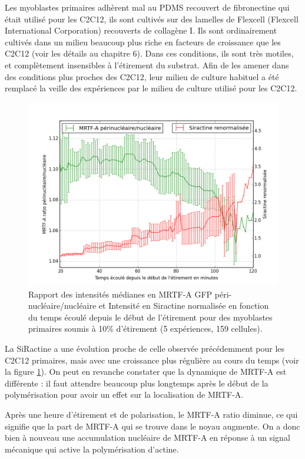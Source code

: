 Les myoblastes primaires adhèrent mal au PDMS recouvert de fibronectine qui était utilisé pour les C2C12, ils sont cultivés sur des lamelles de Flexcell (Flexcell International Corporation) recouverts de collagène I. 
Ils sont ordinairement cultivés dans un milieu beaucoup plus riche en facteurs de croissance que les C2C12 (voir les détails au chapitre 6). 
Dans ces conditions, ils sont très motiles, et complètement insensibles à l'étirement du substrat. 
Afin de les amener dans des conditions plus proches des C2C12, leur milieu de culture habituel a été remplacé la veille des expériences par le milieu de culture utilisé pour les C2C12. 

\begin{figure}
\includegraphics[scale=0.4]{Figures/Siractine_MRTFA_vs_temps.png} 
\caption{Rapport des intensités médianes en MRTF-A GFP  péri-nucléaire/nucléaire et Intensité en Siractine normalisée en fonction du temps écoulé depuis le début de l'étirement pour des myoblastes primaires soumis à 10\% d'étirement (5 expériences, 159 cellules). \label{myoblastes_Sir}}
\end{figure}

La SiRactine a une évolution proche de celle observée précédemment pour les C2C12 primaires, mais avec une croissance plus régulière au cours du temps (voir la figure \ref{myoblastes_Sir}). On peut en revanche constater que la dynamique de MRTF-A est différente : il faut attendre beaucoup plus longtemps après le début de la polymérisation pour avoir un effet sur la localisation de MRTF-A. 

Après une heure d'étirement et de polarisation, le MRTF-A ratio diminue, ce qui signifie que la part de MRTF-A qui se trouve dans le noyau augmente. 
On a donc bien à nouveau une accumulation nucléaire de MRTF-A en réponse à un signal mécanique qui active la polymérisation d'actine. 

